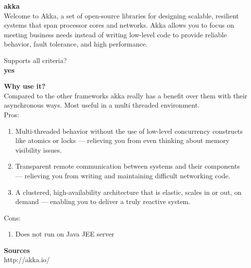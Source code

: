 
		\textbf{akka} \\
		Welcome to Akka, a set of open-source libraries for designing scalable, resilient systems that span processor cores and networks. Akka allows you to focus on meeting business needs instead of writing low-level code to provide reliable behavior, fault tolerance, and high performance.
		
		Supports all criteria?\\
		\textbf{yes}
		
	 	\textbf{Why use it?} \\
		Compared to the other frameworks akka really has a benefit over them with their asynchronous ways. Most useful in a multi threaded environment.\\
		
		
		Pros:
		\begin{enumerate}
			\item Multi-threaded behavior without the use of low-level concurrency constructs like atomics or locks — relieving you from even thinking about memory visibility issues.
			\item Transparent remote communication between systems and their components — relieving you from writing and maintaining difficult networking code.
			\item A clustered, high-availability architecture that is elastic, scales in or out, on demand — enabling you to deliver a truly reactive system.
		\end{enumerate}
		Cons:
		\begin{enumerate}
			\item Does not run on Java JEE server
		\end{enumerate}
	
	\textbf{Sources}\\
	http://akka.io/